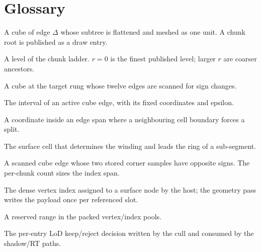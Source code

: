 \section{Glossary}
\label{app:glossary}

\begin{description}[leftmargin=2.2em,style=nextline]
\item[Chunk] A cube of edge $\Delta$ whose subtree is flattened and meshed
  as one unit.  A chunk root is published as a draw entry.
\item[Rung] A level of the chunk ladder.  $r=0$ is the finest published
  level; larger $r$ are coarser ancestors.
\item[Scan cell] A cube at the target rung whose twelve edges are scanned
  for sign changes.
\item[Edge span] The interval of an active cube edge, with its fixed
  coordinates and epsilon.
\item[Break] A coordinate inside an edge span where a neighbouring cell
  boundary forces a split.
\item[Owner] The surface cell that determines the winding and leads the
  ring of a sub-segment.
\item[Cross edge] A scanned cube edge whose two stored corner samples have
  opposite signs.  The per-chunk count sizes the index span.
\item[Slot] The dense vertex index assigned to a surface node by the host;
  the geometry pass writes the payload once per referenced slot.
\item[Span] A reserved range in the packed vertex/index pools.
\item[Stamp] The per-entry LoD keep/reject decision written by the cull and
  consumed by the shadow/RT paths.
\end{description}
